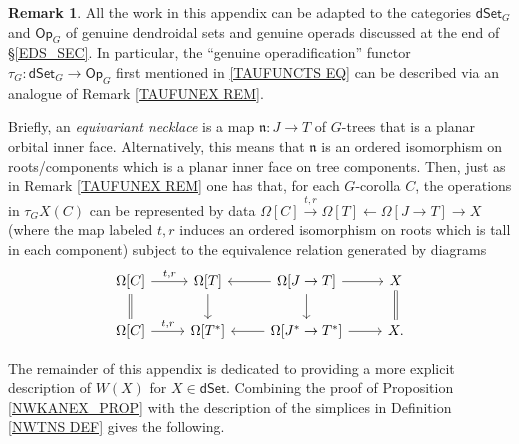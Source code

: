 \documentclass[a4paper,10pt]{article}%
\numberwithin{equation}{section}
\numberwithin{figure}{section}
\theoremstyle{definition} %
\newtheorem{remark}[equation]{Remark}%
\newcommand{\1}{\ensuremath{\mathbbm 1}}%
\begin{document}
\begin{remark}\label{GTAUFUNEX REM}
	All the work in this appendix can be adapted to the categories
	$\mathsf{dSet}_G$ and $\mathsf{Op}_G$
	of genuine dendroidal sets and genuine operads
	discussed at the end of \S \ref{EDS_SEC}.
%	
	In particular, 
	the ``genuine operadification'' functor
	$\tau_G \colon \mathsf{dSet}_G \to \mathsf{Op}_G$
	first mentioned in
	\eqref{TAUFUNCTS EQ}
	can be described via an analogue of
	Remark \ref{TAUFUNEX REM}.
	
Briefly,
an \emph{equivariant necklace}
is a map $\mathfrak{n} \colon J \to T$ of $G$-trees
that is a planar orbital inner face.
Alternatively, this means that $\mathfrak{n}$
is an ordered isomorphism on roots/components which is a planar inner face on tree components. 
%
Then, just as in Remark \ref{TAUFUNEX REM}
one has that, for each $G$-corolla $C$,
the operations in 
$\tau_G X(C)$
can be represented by data
$\Omega[C] \xrightarrow{t,r}
\Omega[T] \leftarrow
\Omega[J \to T] \to 
X$
(where the map labeled $t,r$ induces an ordered isomorphism on roots which is tall in each component)
subject to the equivalence relation generated by diagrams
\[
\begin{tikzcd}
\Omega[C] \ar{r}{t,r} \ar[equal]{d} &
\Omega[T] \ar{d} &
\Omega[J \to T] \ar{l} \ar{r} \ar{d} &
X \ar[equal]{d}
\\
\Omega[C] \ar{r}{t,r} &
\Omega[T^{\**}] &
\Omega[J^{\**} \to T^{\**}] \ar{l} \ar{r} &
X.
\end{tikzcd}
\]

\end{remark}




The remainder of this appendix is dedicated to providing a more explicit description of $W(X)$ for $X \in \mathsf{dSet}$.
%
Combining the proof of Proposition \ref{NWKANEX_PROP}
with the description of the simplices 
in Definition \ref{NWTNS DEF} gives the following.
\end{document}
